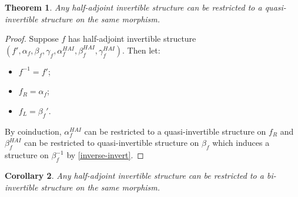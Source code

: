 \documentclass[draft]{article}
\newtheorem{theorem}{Theorem} \newtheorem{prop}[theorem]{Proposition}
\newtheorem{cor}[theorem]{Corollary}
\newcommand{\inv}[1]{#1^{-1}} \newcommand{\comp}{\star}
\begin{document}
\begin{theorem}
  Any half-adjoint invertible structure can be restricted to a
  quasi-invertible structure on the same morphism.
\end{theorem}
\begin{proof}
  Suppose \(f\) has half-adjoint invertible structure \((f',
  \alpha_f, \beta_f, \gamma_f, \alpha_f^{HAI}, \beta_f^{HAI},
  \gamma_f^{HAI})\). Then let:
  \begin{itemize}
  \item \(\inv f = {f'}\);
  \item \(f_R = \alpha_f\);
  \item \(f_L = \beta_f'\).
  \end{itemize}
  By coinduction, \(\alpha_f^{HAI}\) can be restricted to a
  quasi-invertible structure on \(f_R\) and \(\beta_f^{HAI}\) can be
  restricted to quasi-invertible structure on \(\beta_f\) which
  induces a structure on \(\inv {\beta_f}\) by \cref{inverse-invert}.
\end{proof}

\begin{cor}
  Any half-adjoint invertible structure can be restricted to a
  bi-invertible structure on the same morphism.
\end{cor}
\end{document}
